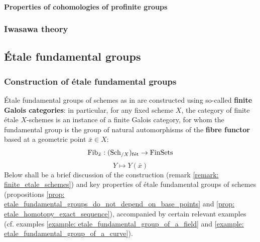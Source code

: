             \paragraph{Properties of cohomologies of profinite groups}
        
        \subsubsection{Iwasawa theory}
        
    \subsection{\'Etale fundamental groups}
        \subsubsection{Construction of \'etale fundamental groups}
            \'Etale fundamental groups of schemes as in \cite[Expos\'e V]{SGA1} are constructed using so-called \textbf{finite Galois categories}: in particular, for any fixed scheme $X$, the category of finite \'etale $X$-schemes is an instance of a finite Galois category, for whom the fundamental group is the group of natural automorphisms of the \textbf{fibre functor} based at a geometric point $\bar{x} \in X$:
                $$\mathrm{Fib}_{\bar{x}}: (\mathrm{Sch}_{/X})_{\mathrm{f\acute{e}t}} \to \mathrm{Fin}\mathrm{Sets}$$
                $$Y \mapsto Y(\bar{x})$$
            Below shall be a brief discussion of the construction (remark \ref{remark: finite_etale_schemes}) and key properties of \'etale fundamental groups of schemes (propositions \ref{prop: etale_fundamental_groups_do_not_depend_on_base_points} and \ref{prop: etale_homotopy_exact_sequence}), accompanied by certain relevant examples (cf. examples \ref{example: etale_fundamental_group_of_a_field} and \ref{example: etale_fundamental_group_of_a_curve}). 
            
